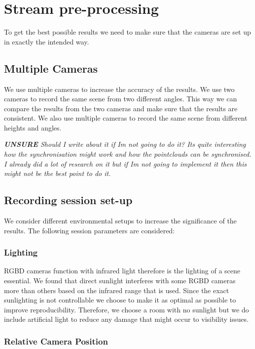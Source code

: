 \section{Stream pre-processing}
\label{sec:stream_pre_processing}

To get the best possible results we need to make sure that the cameras are set up in exactly the intended way. 

\subsection{Multiple Cameras}

We use multiple cameras to increase the accuracy of the results. We use two cameras to record the same scene from two different angles. This way we can compare the results from the two cameras and make sure that the results are consistent. We also use multiple cameras to record the same scene from different heights and angles.

\textit{\textbf{UNSURE} Should I write about it if Im not going to do it? Its quite interesting how the synchronisation might work and how the pointclouds can be synchronised. I already did a lot of research on it but if Im not going to implement it then this might not be the best point to do it.}

\subsection{Recording session set-up}

We consider different environmental setups to increase the significance of the results. The following session parameters are considered:

\subsubsection{Lighting}

RGBD cameras function with infrared light therefore is the lighting of a scene essential. We found that direct sunlight interferes with some RGBD cameras more than others based on the infrared range that is used. Since the exact sunlighting is not controllable we choose to make it as optimal as possible to improve reproducibility. Therefore, we choose a room with no sunlight but we do include artificial light to reduce any damage that might occur to visibility issues.

\subsubsection{Relative Camera Position}

